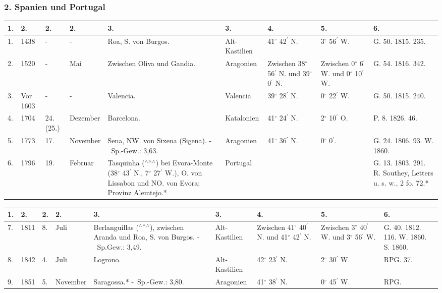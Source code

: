 \documentclass[a4paper, 8pt, oneside, polutonikogreek, german]{article}
\begin{document}
\subsubsection{2. Spanien und Portugal}
\begin{table}[!ht]
    \centering
    \footnotesize
    \begin{tabular}{|l|l|l|l|p{40mm}|l|p{14mm}|p{14mm}|p{18mm}|}
    \hline
        1. & 2. & 2. & 2. & 3. & 3. & 4. & 5. & 6. \\ \hline
        1. & 1438 & - & - & Roa, S. von Burgos. & Alt-Kastilien & 41$^\circ$ 42$^\prime$ N. & 3$^\circ$ 56$^\prime$ W. & G. 50. 1815. 235. \\ \hline
        2. & 1520 & - & Mai & Zwischen Oliva und Gandia. & Aragonien & Zwischen 38$^\circ$ 56$^\prime$ N. und 39$^\circ$ 0$^\prime$ N. & Zwischen 0$^\circ$ 6$^\prime$ W. und 0$^\circ$ 10$^\prime$ W. & G. 54. 1816. 342. \\ \hline
        3. & Vor 1603 & - & - & Valencia. & Valencia & 39$^\circ$ 28$^\prime$ N. & 0$^\circ$ 22$^\prime$ W. & G. 50. 1815. 240. \\ \hline
        4. & 1704 & 24. (25.) & Dezember & Barcelona. & Katalonien & 41$^\circ$ 24$^\prime$ N. & 2$^\circ$ 10$^\prime$ O. & P. 8. 1826. 46. \\ \hline
        5. & 1773 & 17. & November & Sena, NW. von Sixena (Sigena). - Sp.-Gew.: 3,63. & Aragonien & 41$^\circ$ 36$^\prime$ N. & 0$^\circ$ 0$^\prime$. & G. 24. 1806. 93. W. 1860. \\ \hline
        6. & 1796 & 19. & Februar & Tasquinha ($^\wedge$$^\wedge$$^\wedge$) bei Evora-Monte (38$^\circ$ 43$^\prime$ N., 7$^\circ$ 27$^\prime$ W.), O. von Lissabon und NO. von Evora; Provinz Alemtejo.* & Portugal & ~ & ~ & G. 13. 1803. 291. R. Southey, Letters u. s. w., 2 fo. 72.* \\ \hline
    \end{tabular}
\end{table}
\clearpage
\begin{table}[!ht]
    \centering
    \footnotesize
    \begin{tabular}{|l|l|l|l|p{40mm}|l|p{14mm}|p{14mm}|p{14mm}|}
    \hline
        1. & 2. & 2. & 2. & 3. & 3. & 4. & 5. & 6. \\ \hline
        7. & 1811 & 8. & Juli & Berlanguillas ($^\wedge$$^\wedge$$^\wedge$), zwischen Aranda und Roa, S. von Burgos. - Sp.Gew.: 3,49. & Alt-Kastilien & Zwischen 41$^\circ$ 40$^\prime$ N. und 41$^\circ$ 42$^\prime$ N. & Zwischen 3$^\circ$ 40$^\prime$ W. und 3$^\circ$ 56$^\prime$ W. & G. 40. 1812. 116. W. 1860. S. 1860. \\ \hline
        8. & 1842 & 4. & Juli & Logrono. & Alt-Kastilien & 42$^\circ$ 23$^\prime$ N. & 2$^\circ$ 30$^\prime$ W. & RPG. 37. \\ \hline
        9. & 1851 & 5. & November & Saragossa.* - Sp.-Gew.: 3,80. & Aragonien & 41$^\circ$ 38$^\prime$ N. & 0$^\circ$ 45$^\prime$ W. & RPG. \\ \hline
    \end{tabular}
\end{table}
\clearpage
\end{document}
